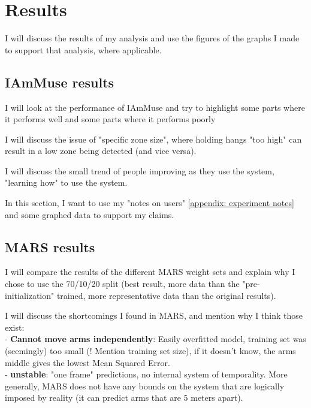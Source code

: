\section{Results}
\label{section: experiments - results}
I will discuss the results of my analysis and use the figures of the graphs I made to support that analysis, where applicable.


\subsection{IAmMuse results}
\label{sub-section: experiments - results - IAmMuse results}
I will look at the performance of IAmMuse and try to highlight some parts where it performs well and some parts where it performs poorly

I will discuss the issue of "specific zone size", where holding hangs "too high" can result in a low zone being detected (and vice versa).

I will discuss the small trend of people improving as they use the system, "learning how" to use the system.

In this section, I want to use my "notes on users" \cref{appendix: experiment notes} and some graphed data to support my claims.

\subsection{MARS results}
\label{sub-section: experiments - results - MARS results}
I will compare the results of the different MARS weight sets and explain why I chose to use the 70/10/20 split (best result, more data than the "pre-initialization" trained, more representative data than the original results).

I will discuss the shortcomings I found in MARS, and mention why I think those exist: \\
- \textbf{Cannot move arms independently}: Easily overfitted model, training set was (seemingly) too small (! Mention training set size), if it doesn't know, the arms middle gives the lowest Mean Squared Error.\\
- \textbf{unstable}: "one frame" predictions, no internal system of temporality. More generally, MARS does not have any bounds on the system that are logically imposed by reality (it can predict arms that are 5 meters apart).

